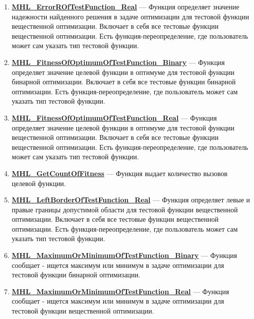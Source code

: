 \documentclass[a4paper,12pt]{article}
\begin{document}
\begin{enumerate}
\item \textbf{\hyperref[MHL_ErrorROfTestFunction_Real]{MHL\_ErrorROfTestFunction\_Real}} --- Функция определяет значение надежности найденного решения в задаче оптимизации для тестовой функции вещественной оптимизации. Включает в себя все тестовые функции  вещественной оптимизации. Есть функция-переопределение, где пользователь может сам указать тип тестовой функции.

\item \textbf{\hyperref[MHL_FitnessOfOptimumOfTestFunction_Binary]{MHL\_FitnessOfOptimumOfTestFunction\_Binary}} --- Функция определяет значение целевой функции в оптимуме для тестовой функции бинарной оптимизации. Включает в себя все тестовые функции бинарной оптимизации. Есть функция-переопределение, где пользователь может сам указать тип тестовой функции.

\item \textbf{\hyperref[MHL_FitnessOfOptimumOfTestFunction_Real]{MHL\_FitnessOfOptimumOfTestFunction\_Real}} --- Функция определяет значение целевой функции в оптимуме для тестовой функции вещественной оптимизации. Включает в себя все тестовые функции вещественной оптимизации. Есть функция-переопределение, где пользователь может сам указать тип тестовой функции.

\item \textbf{\hyperref[MHL_GetCountOfFitness]{MHL\_GetCountOfFitness}} --- Функция выдает количество вызовов целевой функции.

\item \textbf{\hyperref[MHL_LeftBorderOfTestFunction_Real]{MHL\_LeftBorderOfTestFunction\_Real}} --- Функция определяет левые и правые границы допустимой области для тестовой функции вещественной оптимизации. Включает в себя все тестовые функции вещественной оптимизации. Есть функция-переопределение, где пользователь может сам указать тип тестовой функции.

\item \textbf{\hyperref[MHL_MaximumOrMinimumOfTestFunction_Binary]{MHL\_MaximumOrMinimumOfTestFunction\_Binary}} --- 	Функция сообщает - ищется максимум или минимум в задаче оптимизации для тестовой функции бинарной оптимизации.

\item \textbf{\hyperref[MHL_MaximumOrMinimumOfTestFunction_Real]{MHL\_MaximumOrMinimumOfTestFunction\_Real}} --- 	Функция сообщает - ищется максимум или минимум в задаче оптимизации для тестовой функции вещественной оптимизации.


\end{enumerate}
\end{document}
